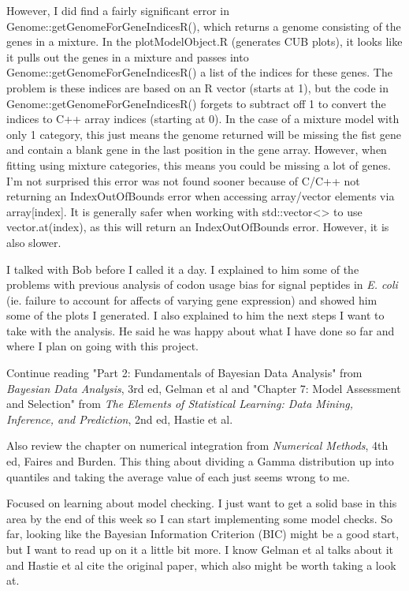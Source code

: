\documentclass[11pt]{labbook}
\begin{document}
However, I did find a fairly significant error in  Genome::getGenomeForGeneIndicesR(), which returns a genome consisting of the genes in a mixture. In the plotModelObject.R (generates CUB plots), it looks like it pulls out the genes in a mixture and passes into Genome::getGenomeForGeneIndicesR() a list of the indices for these genes. The problem is these indices are based on an R vector (starts at 1), but the code in Genome::getGenomeForGeneIndicesR() forgets to subtract off 1 to convert the indices to C++ array indices (starting at 0). In the case of a mixture model with only 1 category, this just means the genome returned will be missing the fist gene and contain a blank gene in the last position in the gene array. However, when fitting using mixture categories, this means you could be missing a lot of genes. I'm not surprised this error was not found sooner because of C/C++ not returning an IndexOutOfBounds error when accessing array/vector elements via array[index]. It is generally safer when working with std::vector<> to use vector.at(index), as this will return an IndexOutOfBounds error. However, it is also slower. 

I talked with Bob before I called it a day. I explained to him some of the problems with previous analysis of codon usage bias for signal peptides in \textit{E. coli} (ie. failure to account for affects of varying gene expression) and showed him some of the plots I generated. I also explained to him the next steps I want to take with the analysis. He said he was happy about what I have done so far and where I plan on going with this project.

Continue reading "Part 2: Fundamentals of Bayesian Data Analysis" from \textit{Bayesian Data Analysis}, 3rd ed, Gelman et al and "Chapter 7: Model Assessment and Selection" from \textit{The Elements of Statistical Learning: Data Mining, Inference, and Prediction}, 2nd ed, Hastie et al.

Also review the chapter on numerical integration from \textit{Numerical Methods}, 4th ed, Faires and Burden. This thing about dividing a Gamma distribution up into quantiles and taking the average value of each just seems wrong to me. 

Focused on learning about model checking. I just want to get a solid base in this area by the end of this week so I can start implementing some model checks. So far, looking like the Bayesian Information Criterion (BIC) might be a good start, but I want to read up on it a little bit more. I know Gelman et al talks about it and Hastie et al cite the original paper, which also might be worth taking a look at. 
\end{document}
